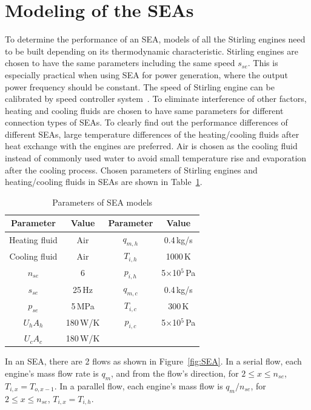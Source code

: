 \documentclass[preprint,5p, twocolumn]{elsarticle}
\begin{document}
\section{Modeling of the SEAs}

To determine the performance of an SEA, models of all the Stirling engines need to be built depending on its thermodynamic characteristic. Stirling engines are chosen to have the same parameters including the same speed $s_{se}$. This is especially practical when using SEA for power generation, where the output power frequency should be constant. The speed of Stirling engine can be calibrated by speed controller system~\cite{Hooshang2016}. To eliminate interference of other factors, heating and cooling fluids are chosen to have same parameters for different connection types of SEAs. To clearly find out the performance differences of different SEAs, large temperature differences of the heating/cooling fluids after heat exchange with the engines are preferred. Air is chosen as the cooling fluid instead of commonly used water to avoid small temperature rise and evaporation after the cooling process. Chosen parameters of Stirling engines and heating/cooling fluids in SEAs are shown in Table~\ref{tab:parameters}. 

\begin{table}[htbp]
	\caption{Parameters of SEA models}
	\begin{center}
	\begin{tabular}{cccc}
		\toprule
		Parameter		&	Value	& Parameter	&	Value\\
		\midrule
		Heating fluid	&	Air		&	$q_{m,h}$	&	0.4\,kg/s\\
		Cooling fluid	&	Air	&	$T_{i,h}$	&	1000\,K\\
		$n_{se}$	&	6	&	$p_{i,h}$	&	5$\times$10$^5$\,Pa\\
		$s_{se}$	&	25\,Hz	&	$q_{m,c}$	&	0.4\,kg/s\\
		$p_{se}$		&	5\,MPa	&	$T_{i,c}$	&	300\,K\\
		$U_hA_h$	&	180\,W/K	&	$p_{i,c}$	&	5$\times$10$^5$\,Pa\\
		$U_cA_c$		&	180\,W/K	&&\\
		\bottomrule
	\end{tabular}
	\end{center}
	\label{tab:parameters}
\end{table}

In an SEA, there are 2 flows as shown in Figure~\ref{fig:SEA}. In a serial flow, each engine's mass flow rate is $q_m$, and from the flow's direction, for $2\leqslant{}x\leqslant{}n_{se}$, $T_{i,x} = T_{o,x-1}$. In a parallel flow, each engine's mass flow is $q_m/n_{se}$, for $2\leqslant{}x\leqslant{}n_{se}$, $T_{i,x} = T_{i,h}$.
\end{document}
